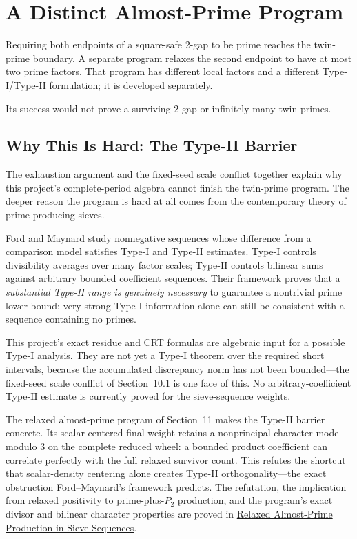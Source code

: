 \section{A Distinct Almost-Prime Program}
\label{sec:almost-prime-program}

Requiring both endpoints of a square-safe 2-gap to be prime reaches the
twin-prime boundary. A separate program relaxes the second endpoint to have at
most two prime factors. That program has different local factors and a
different Type-I/Type-II formulation; it is developed separately.

Its success would not prove a surviving 2-gap or infinitely many twin primes.

\subsection{Why This Is Hard: The Type-II Barrier}
\label{sec:type-two-barrier}

The exhaustion argument and the fixed-seed scale conflict together explain
why this project's complete-period algebra cannot finish the twin-prime
program. The deeper reason the program is hard at all comes from the
contemporary theory of prime-producing sieves.

Ford and Maynard study nonnegative sequences whose difference from a
comparison model satisfies Type-I and Type-II estimates. Type-I controls
divisibility averages over many factor scales; Type-II controls bilinear
sums against arbitrary bounded coefficient sequences. Their framework proves
that a \emph{substantial Type-II range is genuinely necessary} to guarantee a
nontrivial prime lower bound: very strong Type-I information alone can still
be consistent with a sequence containing no primes.

This project's exact residue and CRT formulas are algebraic input for a
possible Type-I analysis. They are not yet a Type-I theorem over the
required short intervals, because the accumulated discrepancy norm has not
been bounded---the fixed-seed scale conflict of Section~10.1 is one face of this.
No arbitrary-coefficient Type-II estimate is currently proved for the
sieve-sequence weights.

The relaxed almost-prime program of Section~11 makes the Type-II barrier concrete.
Its scalar-centered final weight retains a nonprincipal character mode
modulo $3$ on the complete reduced wheel: a bounded product coefficient can
correlate perfectly with the full relaxed survivor count. This refutes the
shortcut that scalar-density centering alone creates Type-II
orthogonality---the exact obstruction Ford--Maynard's framework predicts. The
refutation, the implication from relaxed positivity to prime-plus-$P_2$
production, and the program's exact divisor and bilinear character
properties are proved in
\href{https://github.com/thiagomata/prime-numbers/blob/master/articles/chapter6/relaxed-almost-prime.md}{Relaxed Almost-Prime Production in Sieve Sequences}.

